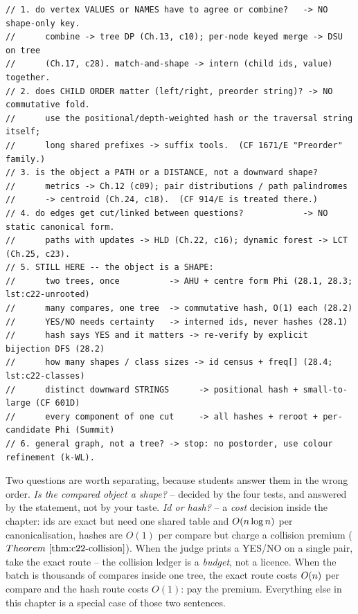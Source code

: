 \begin{lstlisting}[caption={The pick protocol as a decision skeleton -- paste-ready comments for contest code; each branch names the chapter that owns the technique}, label={lst:c22-kit}]
// 1. do vertex VALUES or NAMES have to agree or combine?   -> NO shape-only key.
//      combine -> tree DP (Ch.13, c10); per-node keyed merge -> DSU on tree
//      (Ch.17, c28). match-and-shape -> intern (child ids, value) together.
// 2. does CHILD ORDER matter (left/right, preorder string)? -> NO commutative fold.
//      use the positional/depth-weighted hash or the traversal string itself;
//      long shared prefixes -> suffix tools.  (CF 1671/E "Preorder" family.)
// 3. is the object a PATH or a DISTANCE, not a downward shape?
//      metrics -> Ch.12 (c09); pair distributions / path palindromes
//      -> centroid (Ch.24, c18).  (CF 914/E is treated there.)
// 4. do edges get cut/linked between questions?            -> NO static canonical form.
//      paths with updates -> HLD (Ch.22, c16); dynamic forest -> LCT (Ch.25, c23).
// 5. STILL HERE -- the object is a SHAPE:
//      two trees, once          -> AHU + centre form Phi (28.1, 28.3; lst:c22-unrooted)
//      many compares, one tree  -> commutative hash, O(1) each (28.2)
//      YES/NO needs certainty   -> interned ids, never hashes (28.1)
//      hash says YES and it matters -> re-verify by explicit bijection DFS (28.2)
//      how many shapes / class sizes -> id census + freq[] (28.4; lst:c22-classes)
//      distinct downward STRINGS      -> positional hash + small-to-large (CF 601D)
//      every component of one cut     -> all hashes + reroot + per-candidate Phi (Summit)
// 6. general graph, not a tree? -> stop: no postorder, use colour refinement (k-WL).
\end{lstlisting}

\begin{insightbox}
Two questions are worth separating, because students answer them in the wrong
order.  \emph{Is the compared object a shape?} -- decided by the four tests, and
answered by the statement, not by your taste.  \emph{Id or hash?} -- a
\emph{cost} decision inside the chapter: ids are exact but need one shared table
and \(O(n\log n)\) per canonicalisation, hashes are \(O(1)\) per compare but
charge a collision premium (\(\thmref{c22-collision}\)).  When the judge prints a
YES/NO on a single pair, take the exact route -- the collision ledger is a
\emph{budget}, not a licence.  When the batch is thousands of compares inside one
tree, the exact route costs \(O(n)\) per compare and the hash route costs
\(O(1)\): pay the premium.  Everything else in this chapter is a special case of
those two sentences.
\end{insightbox}

